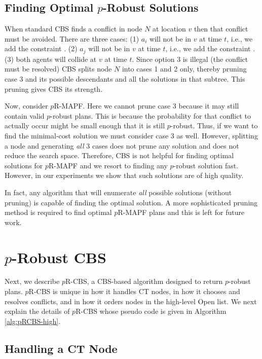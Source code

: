 \documentclass{article}
\newcommand{\prcbs}{$p$R-CBS\xspace}
\newcommand{\prmapf}{$p$R-MAPF\xspace}
\begin{document}
\subsection{Finding Optimal $p$-Robust Solutions}

When standard CBS finds a conflict  in node $N$ at location $v$ then that conflict must be avoided. There are three cases: (1) $a_i$ will not be in $v$ at time $t$, i.e., we add the constraint . (2) $a_j$ will not be in $v$ at time $t$, i.e., we add the constraint .  (3) both agents will collide at $v$ at time  $t$. Since option 3 is illegal (the conflict must be resolved) CBS splits node $N$ into cases 1 and 2 only, thereby pruning case 3 and its possible descendants and all the solutions in that subtree. This pruning gives CBS its strength.

Now, consider \prmapf. Here we cannot prune case 3 because it may still contain valid $p$-robust plans. This is because the probability for that conflict to actually occur might be small enough that it is still $p$-robust. Thus, if we want to find the minimal-cost solution we must consider case 3 as well. However, splitting a node and generating {\em all} 3 cases does not prune any solution and does not reduce the search space. Therefore, CBS is not helpful for finding optimal solutions for \prmapf{} and we resort to finding any $p$-robust solution fast. However, in our experiments we show that such solutions are of high quality.

In fact, any algorithm that will enumerate {\em all} possible solutions (without pruning) is capable of finding the optimal solution. A more sophisticated pruning method is required to find optimal \prmapf{} plans and this is left for future work.

\section{\texorpdfstring{$p$}--Robust CBS}
 \label{sec:probust-cbs}
 
Next, we describe \prcbs, a CBS-based algorithm designed to return $p$-robust plans.  \prcbs{} is unique in how it handles CT nodes, in how it chooses and resolves conflicts, and in how it orders nodes in the high-level Open list. We next explain the details of \prcbs{} whose pseudo code is given in Algorithm \ref{alg:pRCBS-high}. 


\subsection{Handling a CT Node}
\end{document}
